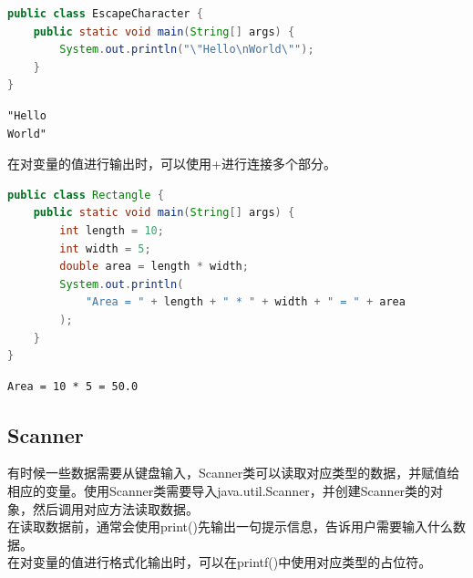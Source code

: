 
\begin{lstlisting}[language=Java]
public class EscapeCharacter {
	public static void main(String[] args) {
		System.out.println("\"Hello\nWorld\"");
	}
}
\end{lstlisting}

\begin{tcolorbox}
	\begin{verbatim}
"Hello
World"
	\end{verbatim}
\end{tcolorbox}

在对变量的值进行输出时，可以使用+进行连接多个部分。\\


\begin{lstlisting}[language=Java]
public class Rectangle {
	public static void main(String[] args) {
		int length = 10;
		int width = 5;
		double area = length * width;
		System.out.println(
			"Area = " + length + " * " + width + " = " + area
		);
	}
}
\end{lstlisting}

\begin{tcolorbox}
	\begin{verbatim}
Area = 10 * 5 = 50.0
	\end{verbatim}
\end{tcolorbox}

\vspace{0.5cm}

\subsection{Scanner}

有时候一些数据需要从键盘输入，Scanner类可以读取对应类型的数据，并赋值给相应的变量。使用Scanner类需要导入java.util.Scanner，并创建Scanner类的对象，然后调用对应方法读取数据。\\

在读取数据前，通常会使用print()先输出一句提示信息，告诉用户需要输入什么数据。\\

在对变量的值进行格式化输出时，可以在printf()中使用对应类型的占位符。\\

\begin{table}[H]
	\centering
	\caption{占位符}
\end{table}

